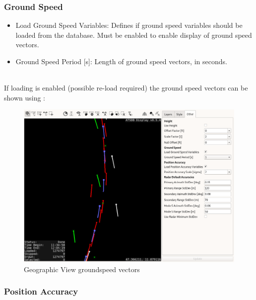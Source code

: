 \subsubsection{Ground Speed}
\label{sec:others_ground_speed}

\begin{itemize}
 \item Load Ground Speed Variables: Defines if ground speed variables should be loaded from the database. Must be enabled to enable display of ground speed vectors.
 \item Ground Speed Period [s]: Length of ground speed vectors, in seconds.
\end{itemize}
\ \\

If loading is enabled (possible re-load required) the ground speed vectors can be shown using :

\begin{figure}[H]
    \hspace*{-2.5cm}
    \includegraphics[width=19cm,frame]{figures/geoview_groundspeed_vectors.png}
  \caption{Geographic View groundspeed vectors}
\end{figure} 

\subsubsection{Position Accuracy}
\label{sec:others_position_accuracy}

